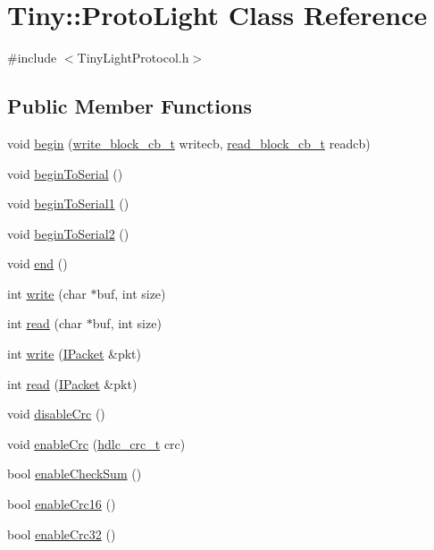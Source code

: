 \hypertarget{classTiny_1_1ProtoLight}{}\section{Tiny\+:\+:Proto\+Light Class Reference}
\label{classTiny_1_1ProtoLight}


{\ttfamily \#include $<$Tiny\+Light\+Protocol.\+h$>$}

\subsection*{Public Member Functions}
\begin{DoxyCompactItemize}
\item 
void \hyperlink{classTiny_1_1ProtoLight_ad27dfcef54a8316228469ef0a4267962}{begin} (\hyperlink{tiny__types_8h_aafd634660bba76cace57a8f9b01e044d}{write\+\_\+block\+\_\+cb\+\_\+t} writecb, \hyperlink{tiny__types_8h_a15bec127d9ee63658563d62e92b5261b}{read\+\_\+block\+\_\+cb\+\_\+t} readcb)
\item 
void \hyperlink{classTiny_1_1ProtoLight_a50bf63fe1891edda48980ca2893485d7}{begin\+To\+Serial} ()
\item 
void \hyperlink{classTiny_1_1ProtoLight_a4de4d11cc7f68dcefa5ca1357e6dfc35}{begin\+To\+Serial1} ()
\item 
void \hyperlink{classTiny_1_1ProtoLight_a40a4d002f53c842b1a3577a8a9c8eebb}{begin\+To\+Serial2} ()
\item 
void \hyperlink{classTiny_1_1ProtoLight_a948b2a0e37177b7434581adc64b36497}{end} ()
\item 
int \hyperlink{classTiny_1_1ProtoLight_a46a27ee9d0b55c88672c98abf04dbdce}{write} (char $\ast$buf, int size)
\item 
int \hyperlink{classTiny_1_1ProtoLight_acf18a8b73ee6c6394270c903ad7882b8}{read} (char $\ast$buf, int size)
\item 
int \hyperlink{classTiny_1_1ProtoLight_ad980940fd5eca35204a70a5cfe5ccccd}{write} (\hyperlink{classTiny_1_1IPacket}{I\+Packet} \&pkt)
\item 
int \hyperlink{classTiny_1_1ProtoLight_aa040cbf16f9c074959fb410db6858b9b}{read} (\hyperlink{classTiny_1_1IPacket}{I\+Packet} \&pkt)
\item 
void \hyperlink{classTiny_1_1ProtoLight_af93e0591ca33137ad79ffb054953001c}{disable\+Crc} ()
\item 
void \hyperlink{classTiny_1_1ProtoLight_a5232e938a70c64eb7fbb8908509cd3fa}{enable\+Crc} (\hyperlink{group__HDLC__API_gabb73b32d08d8e79eefe9385634a74bf7}{hdlc\+\_\+crc\+\_\+t} crc)
\item 
bool \hyperlink{classTiny_1_1ProtoLight_ad7b4ef5a43c187f0d1915efe7450bc40}{enable\+Check\+Sum} ()
\item 
bool \hyperlink{classTiny_1_1ProtoLight_a110b654e476691518790edcc5bf1bd80}{enable\+Crc16} ()
\item 
bool \hyperlink{classTiny_1_1ProtoLight_a8ae8a3ace46234a65f83c564dc56fd26}{enable\+Crc32} ()
\end{DoxyCompactItemize}


